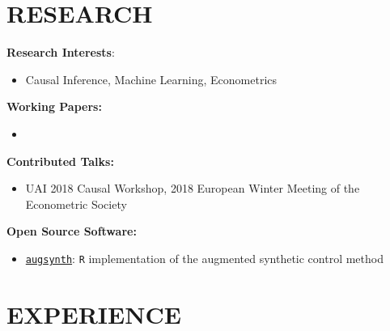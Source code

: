 \documentclass{res}
\begin{document}
\begin{resume}
\section{RESEARCH}
\textbf{Research Interests}:
\begin{itemize}
\item[] Causal Inference, Machine Learning, Econometrics%
\end{itemize}%
\vspace{-4mm}
\textbf{Working Papers:}
\begin{itemize}
\item[] 
\end{itemize}
\vspace{-4mm}
\textbf{Contributed Talks:}
\begin{itemize}
\item[] UAI 2018 Causal Workshop, 2018 European Winter Meeting of the Econometric Society
\end{itemize}
\vspace{-4mm}
\textbf{Open Source Software:}
\begin{itemize}
\item[] \href{https://github.com/ebenmichael/augsynth}{\texttt{augsynth}}: \texttt{R} implementation of the augmented synthetic control method
\end{itemize}
\section{EXPERIENCE}


\end{resume}
\end{document}
